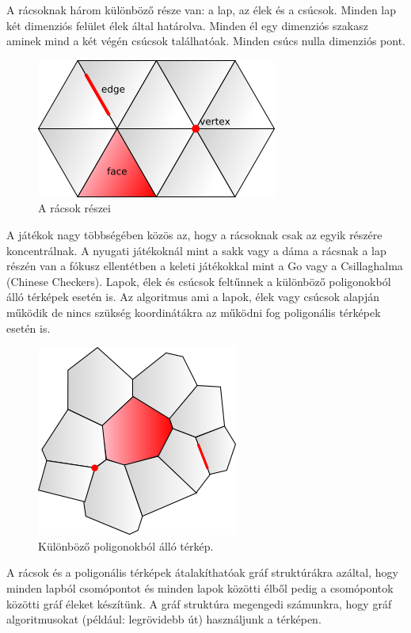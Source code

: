
A rácsoknak három különböző része van: a lap, az élek és a csúcsok. Minden lap két dimenziós felület élek által határolva. Minden él egy dimenziós szakasz aminek mind a két végén csúcsok találhatóak. Minden csúcs nulla dimenziós pont. 

\begin{figure}[h]
\centering
\includegraphics[scale=0.5]{kepek/img31.png}
\caption{A rácsok részei}
\label{fig:img31}
\end{figure}

\noindent A játékok nagy többségében közös az, hogy a rácsoknak csak az egyik részére koncentrálnak. A nyugati játékoknál mint a sakk vagy a dáma a rácsnak a lap részén van a fókusz ellentétben a keleti játékokkal mint a Go vagy a Csillaghalma (Chinese Checkers).
\newline
\newline Lapok, élek és csúcsok feltűnnek a különböző poligonokból álló  térképek esetén is. Az algoritmus ami a lapok, élek vagy csúcsok alapján működik de nincs szükség koordinátákra az működni fog poligonális térképek esetén is.

\begin{figure}[h]
\centering
\includegraphics[scale=0.5]{kepek/img32.png}
\caption{Különböző poligonokból álló térkép.}
\label{fig:img32}
\end{figure}

\noindent A rácsok és a poligonális térképek átalakíthatóak gráf struktúrákra azáltal, hogy minden lapból csomópontot és minden lapok közötti élből pedig a csomópontok közötti gráf éleket készítünk. A gráf struktúra megengedi számunkra, hogy gráf algoritmusokat (például: legrövidebb út) használjunk a térképen.

